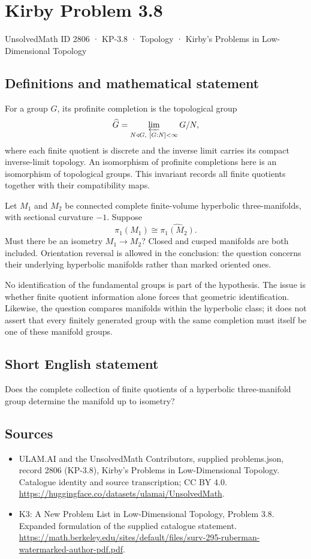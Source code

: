 \documentclass[11pt,a4paper]{article}
\begin{document}
\section*{Kirby Problem 3.8}\label{2806}
{\small UnsolvedMath ID 2806 · KP-3.8 · Topology · Kirby's Problems in Low-Dimensional Topology}
\subsection{Definitions and mathematical statement}
For a group $G$, its profinite completion is the topological group
\[
 \widehat G=\varprojlim_{N\triangleleft G,\ [G:N]<\infty}G/N,
\]
where each finite quotient is discrete and the inverse limit carries its
compact inverse-limit topology. An isomorphism of profinite completions here
is an isomorphism of topological groups. This invariant records all finite
quotients together with their compatibility maps.

Let $M_1$ and $M_2$ be connected complete finite-volume hyperbolic
three-manifolds, with sectional curvature $-1$. Suppose
\[
 \widehat{\pi_1(M_1)}\cong\widehat{\pi_1(M_2)}.
\]
Must there be an isometry $M_1\to M_2$? Closed and cusped manifolds are both
included. Orientation reversal is allowed in the conclusion: the question
concerns their underlying hyperbolic manifolds rather than marked oriented ones.

No identification of the fundamental groups is part of the hypothesis.
The issue is whether finite quotient information alone forces that geometric
identification. Likewise, the question compares manifolds within the hyperbolic
class; it does not assert that every finitely generated group with the same
completion must itself be one of these manifold groups.
\subsection{Short English statement}
Does the complete collection of finite quotients of a hyperbolic three-manifold group determine the manifold up to isometry?
\subsection{Sources}
\begin{itemize}
\item[S1] ULAM.AI and the UnsolvedMath Contributors, supplied problems.json, record 2806 (KP-3.8), Kirby's Problems in Low-Dimensional Topology. Catalogue identity and source transcription; CC BY 4.0.
\url{https://huggingface.co/datasets/ulamai/UnsolvedMath}.
\item[S2] K3: A New Problem List in Low-Dimensional Topology, Problem 3.8. Expanded formulation of the supplied catalogue statement.
\url{https://math.berkeley.edu/sites/default/files/surv-295-ruberman-watermarked-author-pdf.pdf}.
\end{itemize}
\end{document}
